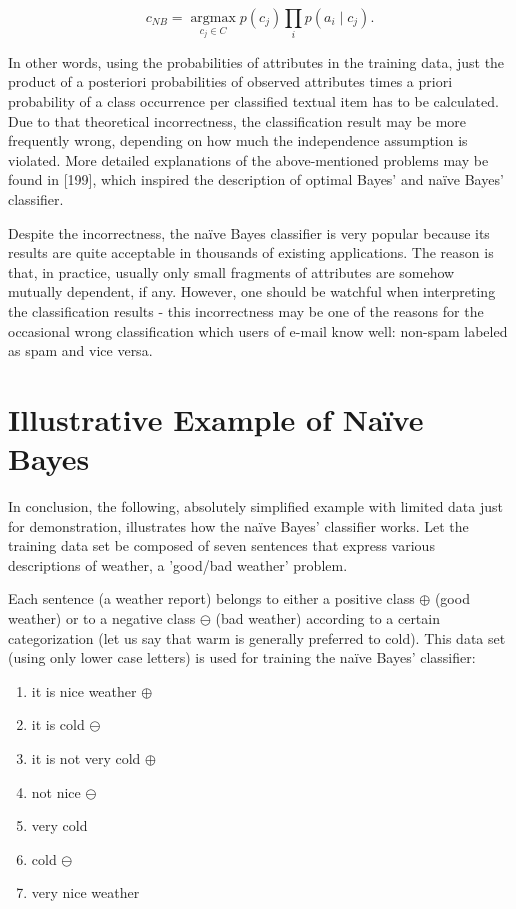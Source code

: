 \documentclass[11pt,openany,executivepaper]{book}
\begin{document}
\begin{equation*}
c_{N B}=\underset{c_{j} \in C}{\operatorname{argmax}} p\left(c_{j}\right) \prod_{i} p\left(a_{i} \mid c_{j}\right) . \tag{5.12}
\end{equation*}


In other words, using the probabilities of attributes in the training data, just the product of a posteriori probabilities of observed attributes times a priori probability of a class occurrence per classified textual item has to be calculated. Due to that theoretical incorrectness, the classification result may be more frequently wrong, depending on how much the independence assumption is violated. More detailed explanations of the above-mentioned problems may be found in [199], which inspired the description of optimal Bayes' and naïve Bayes' classifier.

Despite the incorrectness, the naïve Bayes classifier is very popular because its results are quite acceptable in thousands of existing applications. The reason is that, in practice, usually only small fragments of attributes are somehow mutually dependent, if any. However, one should be watchful when interpreting the classification results - this incorrectness may be one of the reasons for the occasional wrong classification which users of e-mail know well: non-spam labeled as spam and vice versa.

\section{Illustrative Example of Naïve Bayes}
In conclusion, the following, absolutely simplified example with limited data just for demonstration, illustrates how the naïve Bayes' classifier works. Let the training data set be composed of seven sentences that express various descriptions of weather, a 'good/bad weather' problem.

Each sentence (a weather report) belongs to either a positive class $\oplus$ (good weather) or to a negative class $\ominus$ (bad weather) according to a certain categorization (let us say that warm is generally preferred to cold). This data set (using only lower case letters) is used for training the naïve Bayes' classifier:

\begin{enumerate}
  \item it is nice weather $\oplus$
  \item it is cold $\ominus$
  \item it is not very cold $\oplus$
  \item not nice $\ominus$
  \item very cold
  \item cold $\ominus$
  \item very nice weather
\end{enumerate}
\end{document}
